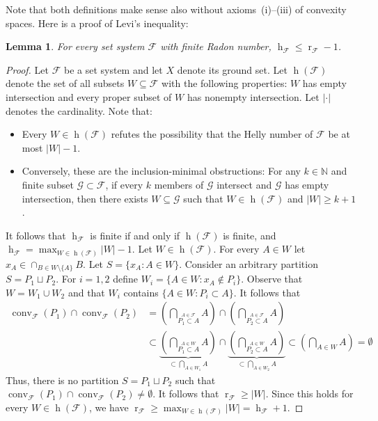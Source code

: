 \documentclass[11pt]{article}
\newcommand{\N}{\mathbb{N}}
\newcommand{\F}{\mathcal{F}}
\newcommand{\G}{\mathcal{G}}
\DeclareMathOperator{\h}{h}
\DeclareMathOperator{\conv}{conv}
\DeclareMathOperator{\rad}{r}
\newcommand{\pth}[1]{\left(#1\right)}
\newtheorem{lemma}{Lemma}[section]
\begin{document}
%
\noindent
Note that both definitions make sense also without axioms~(i)--(iii) of convexity spaces. Here is a proof of Levi's inequality:
%
\begin{lemma}
  For every set system $\F$ with finite Radon number, $\h_\F \le \rad_\F-1$.
\end{lemma}
\begin{proof}
  Let $\F$ be a set system and let $X$ denote its ground set. Let $\h(\F)$ denote the set of all subsets $W \subseteq \F$ with the following properties: $W$ has empty intersection and every proper subset of $W$ has nonempty intersection. Let $|\cdot|$ denotes the cardinality. Note that:
%
  \begin{itemize}
  \item Every $W \in \h(\F)$ refutes the possibility that the Helly number of $\F$ be at most $|W|-1$.\medskip
%
  \item Conversely, these are the inclusion-minimal obstructions: For any $k \in \N$ and finite subset $\G \subset\F$, if every $k$ members of $\G$ intersect and $\G$ has empty intersection, then there exists $W \subseteq \G$ such that $W \in \h(\F)$ and $|W| \ge k+1$.\medskip
  \end{itemize}
%
  \noindent
  It follows that $\h_\F$ is finite if and only if $\h(\F)$ is finite, and $\h_\F = \max_{W \in \h(\F)} |W| - 1$.
%
  \medskip
%
  Let $W \in \h(\F)$. For every $A \in W$ let $x_A \in \cap_{B \in W\setminus\{A\}} B$. Let $S = \{x_A \colon A \in W\}$. Consider an arbitrary partition $S=P_1\sqcup P_2$. 
  For $i=1,2$ define $W_i = \{A \in W \colon x_A \notin P_i\}$. 
%
  Observe that $W = W_1 \cup W_2$ and that $W_i$ contains $\{A \in W \colon P_i \subset A\}$. It follows that
%
  \[\begin{aligned}
  \conv_{\F}(P_1) \cap \conv_{\F}(P_2) & = \pth{\bigcap_{\stackrel{A \in \F}{P_1 \subset A}}A} \cap \pth{\bigcap_{\stackrel{A \in \F}{P_2 \subset A}}A}\\
  & \subset \underbrace{\pth{\bigcap_{\stackrel{A \in W}{P_1 \subset A}}A}}_{\subset\bigcap_{A \in W_1}A} \cap \underbrace{\pth{\bigcap_{\stackrel{A \in W}{P_2 \subset A}}A}}_{\subset\bigcap_{A \in W_2}A} \subset \pth{\bigcap_{A \in W}A} = \emptyset
  \end{aligned}\]
%
  \noindent
  Thus, there is no partition $S=P_1\sqcup P_2$ such that $\conv_{\F}(P_1) \cap \conv_{\F}(P_2) \neq \emptyset$. It follows that $\rad_\F \ge |W|$. Since this holds for every $W \in \h(\F)$, we have $\rad_\F \ge \max_{W \in \h(\F)}|W| = \h_\F+1$.
\end{proof}
\end{document}
